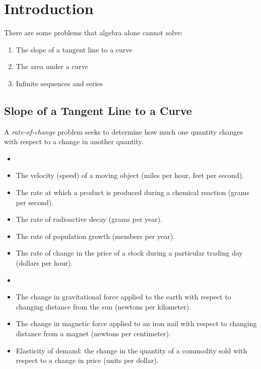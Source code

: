 \documentclass[letterpaper,12pt,fleqn]{article}
\begin{document}
\section*{Introduction}

There are some problems that algebra alone cannot solve:

\begin{enumerate}
\item The slope of a tangent line to a curve
\item The area under a curve
\item Infinite sequences and series
\end{enumerate}

\subsection*{Slope of a Tangent Line to a Curve}

\bigskip

\begin{definition}
  A \emph{rate-of-change} problem seeks to determine how much one quantity changes with respect to a change in
  another quantity.
\end{definition}

\begin{examples}
  \begin{itemize}[left=0in]
  \item[]
  \item The velocity (speed) of a moving object (miles per hour, feet per second).
  \item The rate at which a product is produced during a chemical reaction (grams per second).
  \item The rate of radioactive decay (grams per year).
  \item The rate of population growth (members per year).
  \item The rate of change in the price of a stock during a particular trading day (dollars per hour).
  \end{itemize}
\end{examples}

\begin{examples}
  \begin{itemize}[left=0in]
  \item[]
  \item The change in gravitational force applied to the earth with respect to changing distance from the sun
    (newtons per kilometer).
  \item The change in magnetic force applied to an iron nail with respect to changing distance from a magnet (newtons
    per centimeter).
  \item Elasticity of demand: the change in the quantity of a commodity sold with respect to a change in price
    (units per dollar).
  \end{itemize}
\end{examples}
\end{document}
